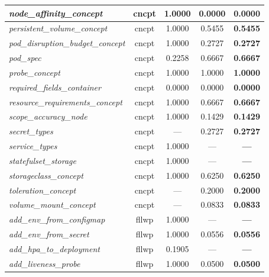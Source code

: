 \begin{footnotesize}
\begin{longtable}{|p{3.6cm}|c|c|c|c|}
\hline
\textit{node\_\allowbreak{}affinity\_\allowbreak{}concept} & cncpt & 1.0000 & 0.0000 & \textbf{0.0000} \\
\hline
\textit{persistent\_\allowbreak{}volume\_\allowbreak{}concept} & cncpt & 1.0000 & 0.5455 & \textbf{0.5455} \\
\hline
\textit{pod\_\allowbreak{}disruption\_\allowbreak{}budget\_\allowbreak{}concept} & cncpt & 1.0000 & 0.2727 & \textbf{0.2727} \\
\hline
\textit{pod\_\allowbreak{}spec} & cncpt & 0.2258 & 0.6667 & \textbf{0.6667} \\
\hline
\textit{probe\_\allowbreak{}concept} & cncpt & 1.0000 & 1.0000 & \textbf{1.0000} \\
\hline
\textit{required\_\allowbreak{}fields\_\allowbreak{}container} & cncpt & 0.0000 & 0.0000 & \textbf{0.0000} \\
\hline
\textit{resource\_\allowbreak{}requirements\_\allowbreak{}concept} & cncpt & 1.0000 & 0.6667 & \textbf{0.6667} \\
\hline
\textit{scope\_\allowbreak{}accuracy\_\allowbreak{}node} & cncpt & 1.0000 & 0.1429 & \textbf{0.1429} \\
\hline
\textit{secret\_\allowbreak{}types} & cncpt & --- & 0.2727 & \textbf{0.2727} \\
\hline
\textit{service\_\allowbreak{}types} & cncpt & 1.0000 & --- & \textbf{---} \\
\hline
\textit{statefulset\_\allowbreak{}storage} & cncpt & 1.0000 & --- & \textbf{---} \\
\hline
\textit{storageclass\_\allowbreak{}concept} & cncpt & 1.0000 & 0.6250 & \textbf{0.6250} \\
\hline
\textit{toleration\_\allowbreak{}concept} & cncpt & --- & 0.2000 & \textbf{0.2000} \\
\hline
\textit{volume\_\allowbreak{}mount\_\allowbreak{}concept} & cncpt & --- & 0.0833 & \textbf{0.0833} \\
\hline
\textit{add\_\allowbreak{}env\_\allowbreak{}from\_\allowbreak{}configmap} & fllwp & 1.0000 & --- & \textbf{---} \\
\hline
\textit{add\_\allowbreak{}env\_\allowbreak{}from\_\allowbreak{}secret} & fllwp & 1.0000 & 0.0556 & \textbf{0.0556} \\
\hline
\textit{add\_\allowbreak{}hpa\_\allowbreak{}to\_\allowbreak{}deployment} & fllwp & 0.1905 & --- & \textbf{---} \\
\hline
\textit{add\_\allowbreak{}liveness\_\allowbreak{}probe} & fllwp & 1.0000 & 0.0500 & \textbf{0.0500} \\

\end{longtable}
\end{footnotesize}

